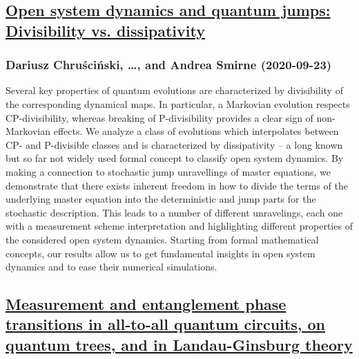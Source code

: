 \subsection*{\href{http://arxiv.org/abs/2009.11312v1}{Open system dynamics and quantum jumps: Divisibility vs. dissipativity}}
\subsubsection*{Dariusz Chruściński, \dots, and Andrea Smirne (2020-09-23)}
Several key properties of quantum evolutions are characterized by
divisibility of the corresponding dynamical maps. In particular, a Markovian
evolution respects CP-divisibility, whereas breaking of P-divisibility provides
a clear sign of non-Markovian effects. We analyze a class of evolutions which
interpolates between CP- and P-divisible classes and is characterized by
dissipativity -- a long known but so far not widely used formal concept to
classify open system dynamics. By making a connection to stochastic jump
unravellings of master equations, we demonstrate that there exists inherent
freedom in how to divide the terms of the underlying master equation into the
deterministic and jump parts for the stochastic description. This leads to a
number of different unravelings, each one with a measurement scheme
interpretation and highlighting different properties of the considered open
system dynamics. Starting from formal mathematical concepts, our results allow
us to get fundamental insights in open system dynamics and to ease their
numerical simulations.

\subsection*{\href{http://arxiv.org/abs/2009.11311v1}{Measurement and entanglement phase transitions in all-to-all quantum  circuits, on quantum trees, and in Landau-Ginsburg theory}}
